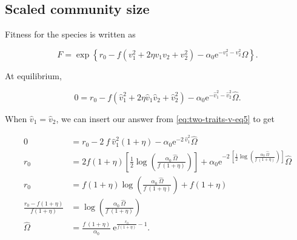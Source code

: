 







\subsection*{Scaled community size}

Fitness for the species is written as

$$
    F = \exp \left\{
        r_0 - f ( {v}_{1}^2 + 2 \eta {v}_{1} {v}_{2} + {v}_{2}^2 ) -
        \alpha_0 \textrm{e}^{ - {v}_{1}^2 - {v}_{2}^2 } {\Omega}
    \right\}
    \textrm{.}
$$


\noindent At equilibrium,

\begin{equation}
    0 = r_0 - f ( \hat{v}_{1}^2 + 2 \eta \hat{v}_{1} \hat{v}_{2} + \hat{v}_{2}^2 ) -
        \alpha_0 \textrm{e}^{ - \hat{v}_{1}^2 - \hat{v}_{2}^2 } \hat{\Omega}
    \textrm{.}
\label{eq:two-traits-omega-equil-start}
\end{equation}


\noindent When $\hat{v}_1 = \hat{v}_2$, we can insert our answer from
\ref{eq:two-traits-v-eq5} to get

\begin{equation*}
\begin{split}
    0 &= r_0 - 2 ~ f ~ \hat{v}_{1}^2 ( 1 + \eta ) -
        \alpha_0 \textrm{e}^{ -2 ~ \hat{v}_{1}^2 } \hat{\Omega} \\
    r_0 &= 2 f ( 1 + \eta ) \left[
        \frac{1}{2}
        \log \left( \frac{ \alpha_0 ~ \hat{\Omega} }{ f ~ ( 1 + \eta ) } \right)
    \right] +
        \alpha_0 \textrm{e}^{ -2 ~
            \left[
                \frac{1}{2} \log \left(
                    \frac{ \alpha_0 ~ \hat{\Omega} }{ f ~ ( 1 + \eta ) }
                \right)
            \right]
        } \hat{\Omega} \\
    r_0 &= f ( 1 + \eta ) \log \left(
        \frac{ \alpha_0 ~ \hat{\Omega} }{ f ~ ( 1 + \eta ) }
    \right) + f ( 1 + \eta ) \\
    \frac{  r_0 - f ( 1 + \eta ) }{ f ( 1 + \eta ) } &=
        \log \left(
        \frac{ \alpha_0 ~ \hat{\Omega} }{ f ~ ( 1 + \eta ) }
        \right) \\
    \hat{\Omega} &= \frac{ f ~ ( 1 + \eta ) }{ \alpha_0 } ~
        \textrm{e}^{\frac{  r_0 }{ f ( 1 + \eta ) } - 1 }
    \textrm{.}
\end{split}
\end{equation*}

